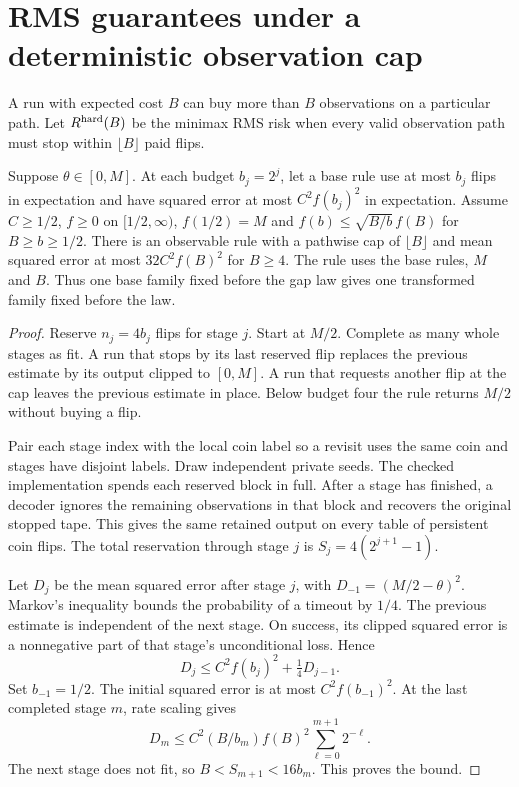 \section{RMS guarantees under a deterministic observation cap}
\label{app:hard-budget}

A run with expected cost $B$ can buy more than $B$ observations on a
particular path. Let $R^{\rm hard}(B)$ be the minimax RMS risk when every
valid observation path must stop within $\lfloor B\rfloor$ paid flips.

\begin{theorem}\label{thm:hard-budget-fallback}
Suppose $\theta\in[0,M]$. At each budget $b_j=2^j$, let a base rule use
at most $b_j$ flips in expectation and have squared error at most
$C^2 f(b_j)^2$ in expectation. Assume $C\ge1/2$, $f\ge0$ on $[1/2,\infty)$,
$f(1/2)=M$ and $f(b)\le\sqrt{B/b}\,f(B)$ for $B\ge b\ge1/2$. There
is an observable rule with a pathwise cap of $\lfloor B\rfloor$ and
mean squared error at most $32C^2 f(B)^2$ for $B\ge4$.
The rule uses the base rules, $M$ and $B$. Thus one base family fixed
before the gap law gives one transformed family fixed before the law.
\end{theorem}

\begin{proof}
Reserve $n_j=4b_j$ flips for stage $j$. Start at $M/2$. Complete as
many whole stages as fit. A run that stops by its last reserved flip
replaces the previous estimate by its output clipped to $[0,M]$.
A run that requests another flip at the cap leaves the previous estimate
in place. Below budget four the rule returns $M/2$ without buying a flip.

Pair each stage index with the local coin label so a revisit uses the
same coin and stages have disjoint labels. Draw independent private seeds.
The checked implementation spends each reserved block in full. After a
stage has finished, a decoder ignores the remaining observations in that
block and recovers the original stopped tape. This gives the same retained
output on every table of persistent coin flips. The total reservation
through stage $j$ is $S_j=4(2^{j+1}-1)$.

Let $D_j$ be the mean squared error after stage $j$, with
$D_{-1}=(M/2-\theta)^2$. Markov's inequality bounds the probability
of a timeout by $1/4$. The previous estimate is independent of the
next stage. On success, its clipped squared error is a nonnegative
part of that stage's unconditional loss. Hence
\[
 D_j\le C^2 f(b_j)^2+\tfrac14 D_{j-1}.
\]
Set $b_{-1}=1/2$. The initial squared error is at most $C^2f(b_{-1})^2$.
At the last completed stage $m$, rate scaling gives
\[
 D_m\le C^2(B/b_m) f(B)^2\sum_{\ell=0}^{m+1}2^{-\ell}.
\]
The next stage does not fit, so $B<S_{m+1}<16b_m$. This proves the bound.
\end{proof}

